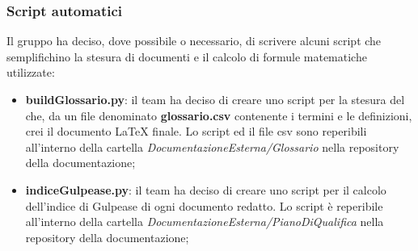\subsubsection{Script automatici}
Il gruppo ha deciso, dove possibile o necessario, di scrivere alcuni script che semplifichino la stesura di documenti e il calcolo di formule matematiche utilizzate:
\begin{itemize}
	\item \textbf{buildGlossario.py}: il team ha deciso di creare uno script per la stesura del \Glossariov che, da un file denominato \textbf{glossario.csv} contenente i termini e le definizioni, crei il documento \LaTeX{} finale. Lo script ed il file csv sono reperibili all'interno della cartella \textit{DocumentazioneEsterna/Glossario} nella repository della documentazione;
	\item \textbf{indiceGulpease.py}: il team ha deciso di creare uno script per il calcolo dell'indice di Gulpease di ogni documento redatto. Lo script è reperibile all'interno della cartella \textit{DocumentazioneEsterna/PianoDiQualifica} nella repository della documentazione;
\end{itemize}